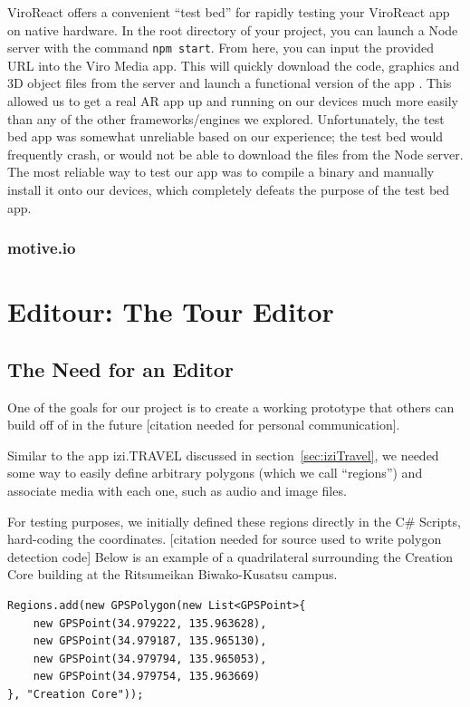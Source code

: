 \documentclass[a4paper, 10pt, american, titlepage]{article}
\begin{document}
ViroReact offers a convenient ``test bed'' for rapidly testing your ViroReact
app on native hardware. In the root directory of your project, you can launch
a Node server with the command \texttt{npm start}. From here, you can input
the provided URL into the Viro Media app. This will quickly download the code,
graphics and 3D object files from the server and launch a functional version
of the app \autocite{viro-testbed2019}. This allowed us to get a real AR app
up and running on our devices much more easily than any of the other
frameworks/engines we explored. Unfortunately, the test bed app was somewhat
unreliable based on our experience; the test bed would frequently crash,
or would not be able to download the files from the Node server. The most
reliable way to test our app was to compile a binary and manually install it
onto our devices, which completely defeats the purpose of the test bed app.

\subsubsection{motive.io}
\label{sec:motive.io}

\section{Editour: The Tour Editor}
\label{sec:editour}

\subsection{The Need for an Editor}

One of the goals for our project is to create a working prototype that others
can build off of in the future [citation needed for personal communication].

Similar to the app izi.TRAVEL discussed in section~\ref{sec:iziTravel}, we
needed some way to easily define arbitrary polygons (which we call ``regions'')
and associate media with each one, such as audio and image files.

For testing purposes, we initially defined these regions directly in the C\#
Scripts, hard-coding the coordinates. [citation needed for source used to
write polygon detection code] Below is an example of a quadrilateral
surrounding the Creation Core building at the Ritsumeikan Biwako-Kusatsu
campus.

\begin{verbatim}
Regions.add(new GPSPolygon(new List<GPSPoint>{
    new GPSPoint(34.979222, 135.963628),
    new GPSPoint(34.979187, 135.965130),
    new GPSPoint(34.979794, 135.965053),
    new GPSPoint(34.979754, 135.963669)
}, "Creation Core"));
\end{verbatim}
\end{document}
